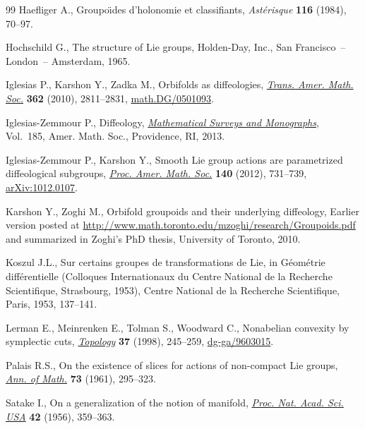\documentclass[pdftex]{sigma}
\numberwithin{equation}{section}
\begin{document}
\begin{thebibliography}{99}
Haef\/liger A., Groupo\"\i des d'holonomie et classif\/iants, \textit{Ast\'erisque}
 \textbf{116} (1984), 70--97.

Hochschild G., The structure of {L}ie groups, Holden-Day, Inc., San
 Francisco~-- London~-- Amsterdam, 1965.

Iglesias P., Karshon Y., Zadka M., Orbifolds as dif\/feologies, \href{http://dx.doi.org/10.1090/S0002-9947-10-05006-3}{\textit{Trans.
 Amer. Math. Soc.}} \textbf{362} (2010), 2811--2831, \href{http://arxiv.org/abs/math.DG/0501093}{math.DG/0501093}.

Iglesias-Zemmour P., Dif\/feology, \href{http://dx.doi.org/10.1090/surv/185}{\textit{Mathematical Surveys and Monographs}},
 Vol.~185, Amer. Math. Soc., Providence, RI, 2013.

Iglesias-Zemmour P., Karshon Y., Smooth {L}ie group actions are parametrized
 dif\/feological subgroups, \href{http://dx.doi.org/10.1090/S0002-9939-2011-11301-7}{\textit{Proc. Amer. Math. Soc.}} \textbf{140} (2012),
 731--739, \href{http://arxiv.org/abs/1012.0107}{arXiv:1012.0107}.

Karshon Y., Zoghi M., Orbifold groupoids and their underlying dif\/feology,
 {E}arlier version posted at
 \url{http://www.math.toronto.edu/mzoghi/research/Groupoids.pdf} and
 summarized in Zoghi's PhD thesis, University of Toronto, 2010.

Koszul J.L., Sur certains groupes de transformations de {L}ie, in G\'eom\'etrie
 dif\/f\'erentielle ({C}olloques {I}nternationaux du {C}entre {N}ational de la
 {R}echerche {S}cientif\/ique, {S}trasbourg, 1953), Centre National de la
 Recherche Scientif\/ique, Paris, 1953, 137--141.

Lerman E., Meinrenken E., Tolman S., Woodward C., Nonabelian convexity by
 symplectic cuts, \href{http://dx.doi.org/10.1016/S0040-9383(97)00030-X}{\textit{Topology}} \textbf{37} (1998), 245--259,
 \href{http://arxiv.org/abs/dg-ga/9603015}{dg-ga/9603015}.

Palais R.S., On the existence of slices for actions of non-compact {L}ie
 groups, \href{http://dx.doi.org/10.2307/1970335}{\textit{Ann. of Math.}} \textbf{73} (1961), 295--323.

Satake I., On a generalization of the notion of manifold, \href{http://dx.doi.org/10.1073/pnas.42.6.359}{\textit{Proc. Nat.
 Acad. Sci. USA}} \textbf{42} (1956), 359--363.


\end{thebibliography}
\end{document}
